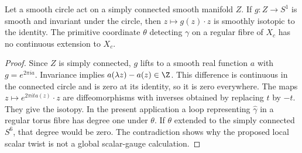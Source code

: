 \begin{proposition}\label{push:src:C.3.2}
Let a smooth circle act on a simply connected smooth manifold $Z$.
If $g:Z\to S^1$ is smooth and invariant under the circle, then
$z\mapsto g(z)\cdot z$ is smoothly isotopic to the identity.
The primitive coordinate $\theta$ detecting $\gamma$ on a regular
fibre of $X_c$ has no continuous extension to $X_c$.
\end{proposition}

\begin{proof}
Since $Z$ is simply connected, $g$ lifts to a smooth real function
$a$ with $g=e^{2\pi ia}$. Invariance implies
$a(\lambda z)-a(z)\in\Z$. This difference is continuous in the
connected circle and is zero at its identity, so it is zero
everywhere. The maps $z\mapsto e^{2\pi ita(z)}\cdot z$ are
diffeomorphisms with inverses obtained by replacing $t$ by $-t$.
They give the isotopy. In the present application a loop representing
$\widehat\gamma$ in a regular torus fibre has degree one under
$\theta$. If $\theta$ extended to the simply connected $S^6$,
that degree would be zero. The contradiction shows why the proposed local scalar twist is not a global scalar-gauge calculation.
\end{proof}

